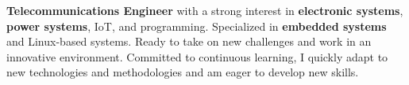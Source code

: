 \documentclass[10pt,a4paper,ragged2e,withhyper]{altacv}
\begin{document}


\makecvheader



\textbf{Telecommunications Engineer} with a strong interest in \textbf{electronic systems}, \textbf{power systems}, IoT, and programming. Specialized in \textbf{embedded systems} and Linux-based systems. Ready to take on new challenges and work in an innovative environment. Committed to continuous learning, I quickly adapt to new technologies and methodologies and am eager to develop new skills.
\end{document}
